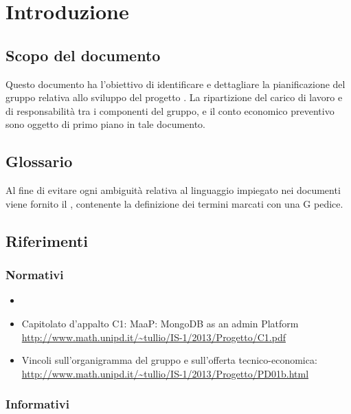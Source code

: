 \section{Introduzione}

	\subsection{Scopo del documento}

Questo documento ha l'obiettivo di identificare e dettagliare la pianificazione del gruppo \GroupName{} relativa allo sviluppo del progetto \ProjectName . La ripartizione del carico di lavoro e di responsabilità tra i componenti del gruppo, e il conto economico preventivo sono oggetto di primo piano in tale documento.
	
	\subsection{Glossario}
	
Al fine di evitare ogni ambiguità relativa al linguaggio impiegato nei documenti viene fornito il \Glossario{} , contenente la definizione dei termini marcati con una G pedice.	
	
	\subsection{Riferimenti}
	
		\subsubsection{Normativi}
		
		\begin{itemize}
		\item \NormeDiProgetto
		\item Capitolato d'appalto C1: MaaP: MongoDB as an admin Platform\\
			\url{http://www.math.unipd.it/~tullio/IS-1/2013/Progetto/C1.pdf}
		\item Vincoli sull'organigramma del gruppo e sull'offerta tecnico-economica:\\
			\url{http://www.math.unipd.it/~tullio/IS-1/2013/Progetto/PD01b.html}
        \end{itemize}
        
		\subsubsection{Informativi}
		
